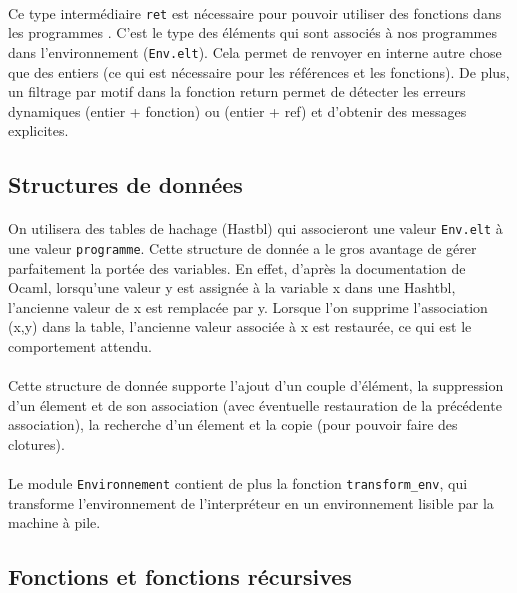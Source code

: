 \paragraph{} Ce type intermédiaire \texttt{ret} est nécessaire pour pouvoir utiliser des fonctions dans les programmes \fouine. C'est le type des éléments qui sont associés à nos programmes dans l'environnement (\texttt{Env.elt}). Cela permet de renvoyer en interne autre chose que des entiers (ce qui est nécessaire pour les références et les fonctions). De plus, un filtrage par motif dans la fonction return permet de détecter les erreurs dynamiques (entier + fonction) ou (entier + ref) et d'obtenir des messages explicites.

\subsection{Structures de données}

\paragraph{} On utilisera des tables de hachage (Hastbl) qui associeront une valeur \texttt{Env.elt} à une valeur \texttt{programme}. Cette structure de donnée a le gros avantage de gérer parfaitement la portée des variables. En effet, d'après la documentation de Ocaml, lorsqu'une valeur y est assignée à la variable x dans une Hashtbl, l'ancienne valeur de x est remplacée par y. Lorsque l'on supprime l'association (x,y) dans la table, l'ancienne valeur associée à x est restaurée, ce qui est le comportement attendu.

\paragraph{} Cette structure de donnée supporte l'ajout d'un couple d'élément, la suppression d'un élement et de son association (avec éventuelle restauration de la précédente association), la recherche d'un élement et la copie (pour pouvoir faire des clotures).

\paragraph{} Le module \texttt{Environnement} contient de plus la fonction \texttt{transform\_env}, qui transforme l'environnement de l'interpréteur en un environnement lisible par la machine à pile.

\subsection{Fonctions et fonctions récursives}

